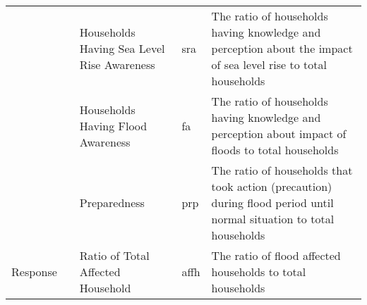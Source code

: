 \begin{table*}[!ht]
{\begin{tabular}{|l|l|p{5.1cm}|l|p{9.5cm}|}
                            &                                           & Households Having Sea Level Rise Awareness      & sra              & The ratio of households having knowledge and perception about the impact of sea level rise to total households                                                                                                                     \\ \cline{3-5} 
                            &                                           & Households Having Flood Awareness               & fa               & The ratio of households having knowledge and perception about impact of floods to total households                                                                                                                    \\ \cline{3-5} 
                            &                                           & Preparedness                                    & prp              & The ratio of households that took action (precaution) during flood period until normal situation to total households                                                                                                                       \\ \hline
Response                    &                                           & Ratio of Total Affected Household               & affh             & The ratio of flood affected households to total households                                                                                                               \\ \hline
\end{tabular}%

}

\vspace{-0.5cm}
\end{table*}


